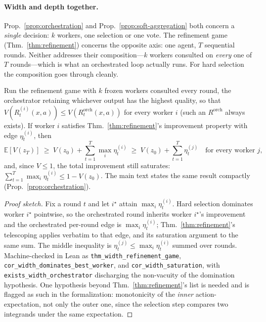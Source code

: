 \paragraph{Width and depth together.} Prop.~\ref{prop:orchestration} and Prop.~\ref{prop:soft-aggregation} both concern a \emph{single} decision: $k$ workers, one selection or one vote. The refinement game (Thm.~\ref{thm:refinement}) concerns the opposite axis: one agent, $T$ sequential rounds. Neither addresses their composition---$k$ workers consulted on \emph{every} one of $T$ rounds---which is what an orchestrated loop actually runs. For hard selection the composition goes through cleanly.

\begin{proposition}
\label{prop:width-refinement}
Run the refinement game with $k$ frozen workers consulted every round, the orchestrator retaining whichever output has the highest quality, so that $V(R^{(i)}_t(x,a)) \le V(R^{\mathrm{orch}}_t(x,a))$ for every worker $i$ (such an $R^{\mathrm{orch}}$ always exists). If worker $i$ satisfies Thm.~\ref{thm:refinement}'s improvement property with edge $\eta_t^{(i)}$, then
\[
\mathbb{E}[V(z_T)] \;\ge\; V(z_0) + \sum_{t=1}^{T}\max_i \eta_t^{(i)} \;\ge\; V(z_0) + \sum_{t=1}^{T}\eta_t^{(j)} \quad\text{for every worker } j,
\]
and, since $V\le1$, the total improvement still saturates: $\sum_{t=1}^{T}\max_i \eta_t^{(i)} \le 1-V(z_0)$. The main text states the same result compactly (Prop.~\ref{prop:orchestration}).
\end{proposition}

\begin{proof}[Proof sketch]
Fix a round $t$ and let $i^\star$ attain $\max_i \eta_t^{(i)}$. Hard selection dominates worker $i^\star$ pointwise, so the orchestrated round inherits worker $i^\star$'s improvement and the orchestrated per-round edge is $\max_i \eta_t^{(i)}$; Thm.~\ref{thm:refinement}'s telescoping applies verbatim to that edge, and its saturation argument to the same sum. The middle inequality is $\eta_t^{(j)}\le\max_i \eta_t^{(i)}$ summed over rounds. Machine-checked in Lean as \texttt{thm\_width\_refinement\_game}, \texttt{cor\_width\_dominates\_best\_worker}, and \texttt{cor\_width\_saturation}, with \texttt{exists\_width\_orchestrator} discharging the non-vacuity of the domination hypothesis. One hypothesis beyond Thm.~\ref{thm:refinement}'s list is needed and is flagged as such in the formalization: monotonicity of the \emph{inner} action-expectation, not only the outer one, since the selection step compares two integrands under the same expectation.
\end{proof}

